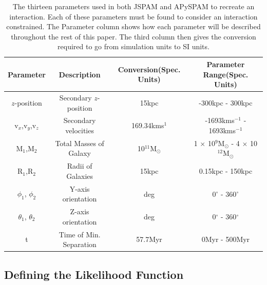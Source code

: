 \begin{table}
    \centering
    \begin{tabular}{|c|c|c|c|}
        \hline
        Parameter & Description & Conversion(Spec. Units) & Parameter Range(Spec. Units)  \\
        \hline
        $z$-position & Secondary $z$-position & 15kpc & -300kpc - 300kpc \\
        v$_{x}$,v$_{y}$,v$_{z}$ & Secondary velocities & 169.34kms$^{1}$ & -1693kms$^{-1}$ - 1693kms$^{-1}$ \\
        M$_{1}$,M$_{2}$ & Total Masses of Galaxy & 10$^{11}$M$_{\odot}$ & 1 $\times$ 10$^{9}$M$_{\odot}$ - 4 $\times$ 10$^{12}$M$_{\odot}$ \\
        R$_{1}$,R$_{2}$ & Radii of Galaxies & 15kpc & 0.15kpc - 150kpc\\
        $\phi_{1}$, $\phi_{2}$ & Y-axis orientation & deg & 0$^{\circ}$ - 360$^{\circ}$ \\
        $\theta_{1}$, $\theta_{2}$ & Z-axis orientation & deg & 0$^{\circ}$ - 360$^{\circ}$ \\
        t & Time of Min. Separation & 57.7Myr & 0Myr - 500Myr \\
        \hline
    \end{tabular}
    \caption{The thirteen parameters used in both JSPAM and APySPAM to recreate an interaction. Each of these parameters must be found to consider an interaction constrained. The Parameter column shows how each parameter will be described throughout the rest of this paper. The third column then gives the conversion required to go from simulation units to SI units.}
    \label{tab:parameters}
\end{table}

\subsection{Defining the Likelihood Function}
